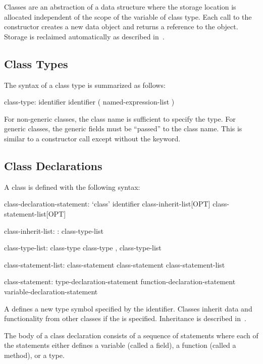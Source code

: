 \label{Classes}

Classes are an abstraction of a data structure where the storage
location is allocated independent of the scope of the variable of
class type.  Each call to the constructor creates a new data object
and returns a reference to the object.  Storage is reclaimed
automatically as described in~.

\subsection{Class Types}
\label{Class_Types}

The syntax of a class type is summarized as follows:
\begin{syntax}
class-type:
  identifier
  identifier ( named-expression-list )
\end{syntax}
For non-generic classes, the class name is sufficient to specify the
type.  For generic classes, the generic fields must be ``passed'' to
the class name.  This is similar to a constructor call except without
the  keyword.

\subsection{Class Declarations}
\label{Class_Declarations}

A class is defined with the following syntax:
\begin{syntax}
class-declaration-statement:
  `class' identifier class-inherit-list[OPT] {
    class-statement-list[OPT] }

class-inherit-list:
  : class-type-list

class-type-list:
  class-type
  class-type , class-type-list

class-statement-list:
  class-statement
  class-statement class-statement-list

class-statement:
  type-declaration-statement
  function-declaration-statement
  variable-declaration-statement
\end{syntax}
A  defines a new type symbol
specified by the identifier.  Classes inherit data and functionality
from other classes if the  is specified.
Inheritance is described in~.

The body of a class declaration consists of a sequence of statements
where each of the statements either defines a variable (called a
field), a function (called a method), or a type.

